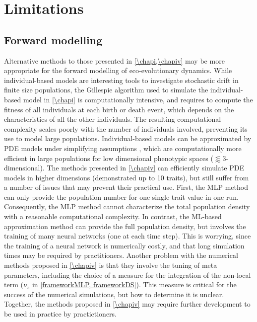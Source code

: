 \section{Limitations}

\subsection{Forward modelling}
Alternative methods to those presented in \cref{\chapi,\chapiv} may be more appropriate for the forward modelling of eco-evolutionary dynamics.
% 
While individual-based models are interesting tools to investigate stochastic drift in finite size populations, the Gillespie algorithm \citep{Gillespie1976} used to simulate the individual-based model in \cref{\chapi} is computationally intensive, and requires to compute the fitness of all individuals at each birth or death event, which depends on the characteristics of all the other individuals. The resulting computational complexity scales poorly with the number of individuals involved, preventing its use to model large populations. 
% 
Individual-based models can be approximated by PDE models under simplifying assumptions \citep{Champagnat2006}, which are computationally more efficient in large populations for low dimensional phenotypic spaces ($\lessapprox 3$-dimensional). 
% 
% 
The methods presented in \cref{\chapiv} can efficiently simulate PDE models in higher dimensions (demonstrated up to 10 traits), but still suffer from a number of issues that may prevent their practical use.
% 
First, the MLP method can only provide the population number for one single trait value in one run. Consequently, the MLP method cannot characterize the total population density with a reasonable computational complexity. 
% 
In contrast, the ML-based approximation method can provide the full population density, but involves the training of many neural networks (one at each time step). This is worrying, since the training of a neural network is numerically costly, and that long simulation times may be required by practitioners. Another problem with the numerical methods proposed in \cref{\chapiv} is that they involve the tuning of meta parameters, including the choice of a measure for the integration of the non-local term ($\nu_x$ in \cref{frameworkMLP, frameworkDS}). This measure is critical for the success of the numerical simulations, but how to determine it is unclear.
% 
Together, the methods proposed in \cref{\chapiv} may require further development to be used in practice by practictioners. 

